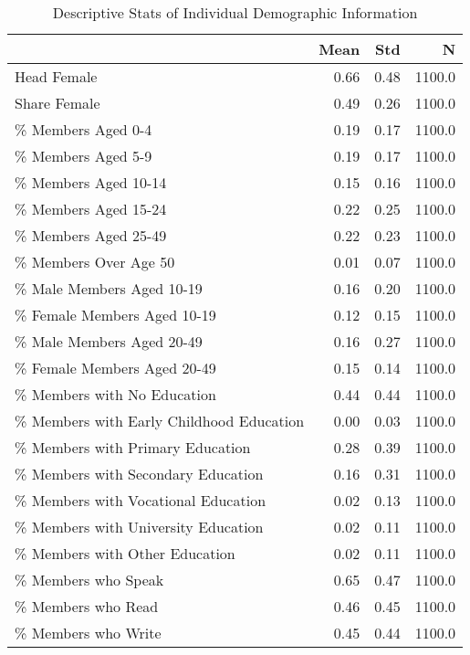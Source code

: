 \begin{longtable}{lrrr}
\caption{Descriptive Stats of Individual  Demographic Information}
\label{table:1}


\\\hline
{} &  Mean &   Std &       N \\
\hline
\endhead

\hline
\endfoot
Head Female                              &  0.66 &  0.48 &  1100.0 \\
Share Female                             &  0.49 &  0.26 &  1100.0 \\
\% Members Aged 0-4                       &  0.19 &  0.17 &  1100.0 \\
\% Members Aged 5-9                       &  0.19 &  0.17 &  1100.0 \\
\% Members Aged 10-14                     &  0.15 &  0.16 &  1100.0 \\
\% Members Aged 15-24                     &  0.22 &  0.25 &  1100.0 \\
\% Members Aged 25-49                     &  0.22 &  0.23 &  1100.0 \\
\% Members Over Age 50                    &  0.01 &  0.07 &  1100.0 \\
\% Male Members Aged 10-19                &  0.16 &  0.20 &  1100.0 \\
\% Female Members Aged 10-19              &  0.12 &  0.15 &  1100.0 \\
\% Male Members Aged 20-49                &  0.16 &  0.27 &  1100.0 \\
\% Female Members Aged 20-49              &  0.15 &  0.14 &  1100.0 \\
\% Members with No Education              &  0.44 &  0.44 &  1100.0 \\
\% Members with Early Childhood Education &  0.00 &  0.03 &  1100.0 \\
\% Members with Primary Education         &  0.28 &  0.39 &  1100.0 \\
\% Members with Secondary Education       &  0.16 &  0.31 &  1100.0 \\
\% Members with Vocational Education      &  0.02 &  0.13 &  1100.0 \\
\% Members with University Education      &  0.02 &  0.11 &  1100.0 \\
\% Members with Other Education           &  0.02 &  0.11 &  1100.0 \\
\% Members who Speak                      &  0.65 &  0.47 &  1100.0 \\
\% Members who Read                       &  0.46 &  0.45 &  1100.0 \\
\% Members who Write                      &  0.45 &  0.44 &  1100.0 \\
\end{longtable}